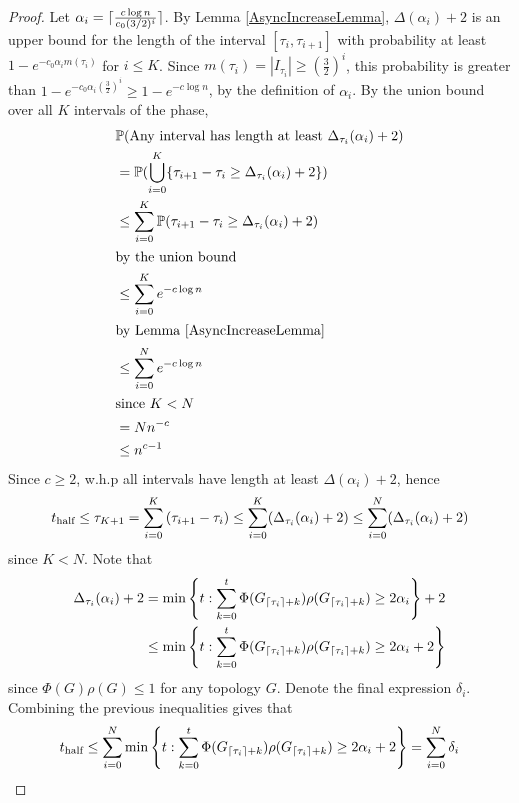 \begin{proof}
	Let $\alpha_i = \lceil\frac{c \log n}{c_0 (3/2)^i}\rceil$.
	By Lemma \ref{AsyncIncreaseLemma}, $\Delta(\alpha_i) + 2$ is an upper bound for the length of the interval $[\tau_i, \tau_{i+1}]$ 
	with probability at least $1 - e^{-c_0\alpha_i m(\tau_i)}$ for $i \leq K$.
	Since $m(\tau_i) = |I_{\tau_i}| \geq (\frac{3}{2})^i$, this probability is greater than $1 - e^{-c_0\alpha_i (\frac{3}{2})^i} \geq 1 - e^{-c \log n}$, by the definition of $\alpha_i$. By the union bound over all $K$ intervals of the phase,
	\begin{align*}
		& \mathbb{P}(\text{Any interval has length at least } \Delta_{\tau_i}(\alpha_i) + 2) \\
		&= \mathbb{P}(\bigcup_{i=0}^K \{\tau_{i+1} - \tau_i \geq \Delta_{\tau_i}(\alpha_i) + 2\}) \\
		&\leq \sum_{i=0}^K \mathbb{P}(\tau_{i+1} - \tau_i \geq \Delta_{\tau_i}(\alpha_i) + 2) \\
		\intertext{by the union bound}
		&\leq \sum_{i=0}^K e^{-c \log n} \\
		\intertext{by Lemma \ref{AsyncIncreaseLemma}}	
		&\leq \sum_{i=0}^N e^{-c \log n} \\
		\intertext{since $K < N$}
		&= N n^{-c} \\
		&\leq n^{c-1}
	\end{align*}
	Since $c \geq 2$, w.h.p all intervals have length at least $\Delta(\alpha_i) + 2$, hence
	\begin{equation}\label{eq:t_halfBound}
		t_\text{half} 
		\leq \tau_{K+1} 
		= \sum_{i=0}^K \left( \tau_{i+1} - \tau_i  \right) 
		\leq \sum_{i=0}^K (\Delta_{\tau_i}(\alpha_i) + 2) 
		\leq \sum_{i=0}^N (\Delta_{\tau_i}(\alpha_i) + 2) 
	\end{equation}
	since $K < N$.
	Note that 
	\begin{align*}
		\Delta_{\tau_i}(\alpha_i) + 2 
		&=
		\min \left\{t: \sum_{k=0}^t \Phi(G_{\lceil\tau_i\rceil+k})\rho(G_{\lceil\tau_i\rceil+k}) \geq 2 \alpha_i \right\} + 2 \\
		&\leq \min \left\{t: \sum_{k=0}^t \Phi(G_{\lceil\tau_i\rceil+k})\rho(G_{\lceil\tau_i\rceil+k}) \geq 2 \alpha_i + 2 \right\}
	\end{align*}
	since $\Phi(G)\rho(G) \leq 1$ for  any topology $G$. Denote the final expression $\delta_i$. Combining the previous inequalities gives that
	\begin{align*}
		t_\text{half} &\leq \sum_{i=0}^N \min \left\{t: \sum_{k=0}^t \Phi(G_{\ceil{\tau_i}+k})\rho(G_{\ceil{\tau_i}+k}) \geq 2 \alpha_i + 2 \right\} = \sum_{i=0}^N \delta_i \\

\end{align*}
\end{proof}
